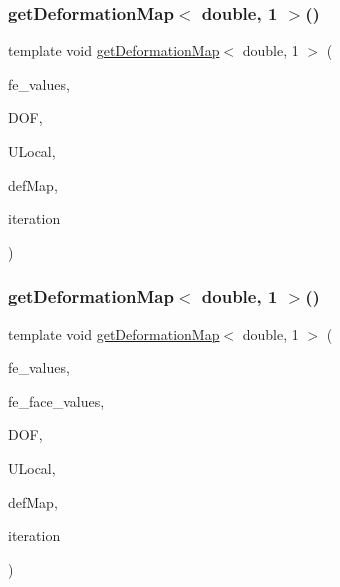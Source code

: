 \mbox{\label{function_evaluations_8cc_a4e726f8c8f17b338819f30946e6d4274}} 
\subsubsection{\texorpdfstring{getDeformationMap$<$ double, 1 $>$()}{getDeformationMap< double, 1 >()}\hspace{0.1cm}{\footnotesize\ttfamily [1/2]}}
{\footnotesize\ttfamily template void \mbox{\hyperlink{group___evaluation_functions_ga239b206235603af9482484c29c8d57ea}{get\+Deformation\+Map}}$<$ double, 1 $>$ (\begin{DoxyParamCaption}\item[{const F\+E\+Values$<$ 1 $>$ \&}]{fe\+\_\+values,  }\item[{unsigned int}]{D\+OF,  }\item[{Table$<$ 1, double $>$ \&}]{U\+Local,  }\item[{\mbox{\hyperlink{structdeformation_map}{deformation\+Map}}$<$ double, 1 $>$ \&}]{def\+Map,  }\item[{unsigned int}]{iteration }\end{DoxyParamCaption})}

\mbox{\label{function_evaluations_8cc_a2128b8b5715cb868caf25dc37b818a1d}} 
\subsubsection{\texorpdfstring{getDeformationMap$<$ double, 1 $>$()}{getDeformationMap< double, 1 >()}\hspace{0.1cm}{\footnotesize\ttfamily [2/2]}}
{\footnotesize\ttfamily template void \mbox{\hyperlink{group___evaluation_functions_ga239b206235603af9482484c29c8d57ea}{get\+Deformation\+Map}}$<$ double, 1 $>$ (\begin{DoxyParamCaption}\item[{const F\+E\+Values$<$ 1 $>$ \&}]{fe\+\_\+values,  }\item[{const F\+E\+Face\+Values$<$ 1 $>$ \&}]{fe\+\_\+face\+\_\+values,  }\item[{unsigned int}]{D\+OF,  }\item[{Table$<$ 1, double $>$ \&}]{U\+Local,  }\item[{\mbox{\hyperlink{structdeformation_map}{deformation\+Map}}$<$ double, 1 $>$ \&}]{def\+Map,  }\item[{unsigned int}]{iteration }\end{DoxyParamCaption})}

